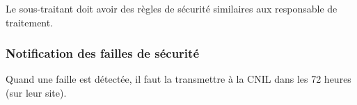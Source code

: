 \documentclass[10pt,a4paper,french]{article}
\begin{document}
Le sous-traitant doit avoir des règles de sécurité similaires aux responsable de traitement.

\subsubsection{Notification des failles de sécurité}

Quand une faille est détectée, il faut la transmettre à la CNIL dans les 72 heures (sur leur site).

\appendix %

\printindex
\end{document}
